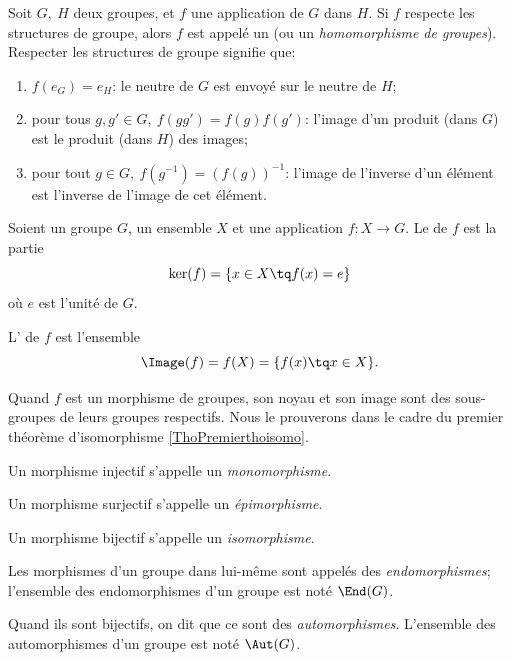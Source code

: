 \begin{definition}
    Soit \(G,\ H\) deux groupes, et \(f \) une application de \(G \) dans \(H \). Si \(f \) respecte les structures de groupe, alors \(f \) est appelé un  (ou un \emph{homomorphisme de groupes}). Respecter les structures de groupe signifie que:
    \begin{enumerate}
    \item \( f(e_G) = e_H \): le neutre de \( G \) est envoyé sur le neutre de \( H \);
    \item pour tous \(g, g' \in G,\ f(gg') = f(g)f(g')\): l'image d'un produit (dans \(G \)) est le produit (dans \( H \)) des images;
    \item pour tout \(g \in G,\ f(g^{-1}) = \left(f(g)\right)^{-1}\): l'image de l'inverse d'un élément est l'inverse de l'image de cet élément.
    \end{enumerate}
\end{definition}


\begin{definition}      \label{DEFooWBIYooGNRYOp}
    Soient un groupe \( G\), un ensemble $X$ et une application \( f\colon X\to G\). Le  de \( f\) est la partie
    \begin{equation}
        \ker(f)=\{ x\in X\tq f(x)=e \}
    \end{equation}
    où \( e\) est l'unité de \( G\).
    
    L' de \(f \) est l'ensemble 
    \begin{equation}
        \Image(f)=f(X) = \{ f(x) \tq x\in X \}.
    \end{equation}
\end{definition}

\begin{remark}
  Quand \( f \) est un morphisme de groupes, son noyau et son image sont des sous-groupes de leurs groupes respectifs. Nous le prouverons dans le cadre du premier théorème d'isomorphisme \ref{ThoPremierthoisomo}.
\end{remark}

\begin{definition}\label{DEFGroupesTypesdeMorphismes}
Un morphisme injectif s'appelle un \emph{monomorphisme}.

Un morphisme surjectif s'appelle un \emph{épimorphisme}.

Un morphisme bijectif s'appelle un \emph{isomorphisme}.

Les morphismes d'un groupe dans lui-même sont appelés des \emph{endomorphismes}; l'ensemble des endomorphismes d'un groupe est noté \( \End(G) \).

Quand ils sont bijectifs, on dit que ce sont des \emph{automorphismes}.  L'ensemble des automorphismes d'un groupe est noté \( \Aut(G) \).
\end{definition}

